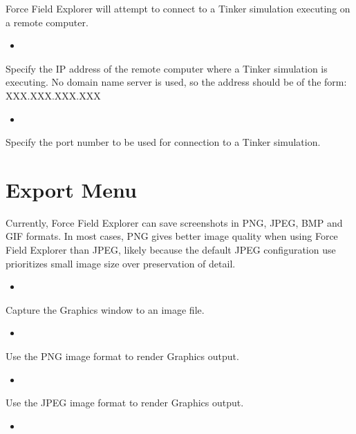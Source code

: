 \documentclass[letterpaper,11pt,english]{sphinxmanual}
\begin{document}
\sphinxAtStartPar
Force Field Explorer will attempt to connect to a Tinker simulation executing on a remote computer.
\begin{itemize}
\item {} 
\sphinxAtStartPar
{}

\end{itemize}

\sphinxAtStartPar
Specify the IP address of the remote computer where a Tinker simulation is executing. No domain name server is used, so the address should be of the form: XXX.XXX.XXX.XXX
\begin{itemize}
\item {} 
\sphinxAtStartPar
{}

\end{itemize}

\sphinxAtStartPar
Specify the port number to be used for connection to a Tinker simulation.


\section{Export Menu}
\label{\detokenize{text/menus:export-menu}}
\sphinxAtStartPar
Currently, Force Field Explorer can save screenshots in PNG, JPEG, BMP and GIF formats. In most cases, PNG gives better image quality when using Force Field Explorer than JPEG, likely because the default JPEG configuration use prioritizes small image size over preservation of detail.
\begin{itemize}
\item {} 
\sphinxAtStartPar
{}

\end{itemize}

\sphinxAtStartPar
Capture the Graphics window to an image file.
\begin{itemize}
\item {} 
\sphinxAtStartPar
{}

\end{itemize}

\sphinxAtStartPar
Use the PNG image format to render Graphics output.
\begin{itemize}
\item {} 
\sphinxAtStartPar
{}

\end{itemize}

\sphinxAtStartPar
Use the JPEG image format to render Graphics output.
\begin{itemize}
\item {} 
\sphinxAtStartPar
{}

\end{itemize}
\end{document}
